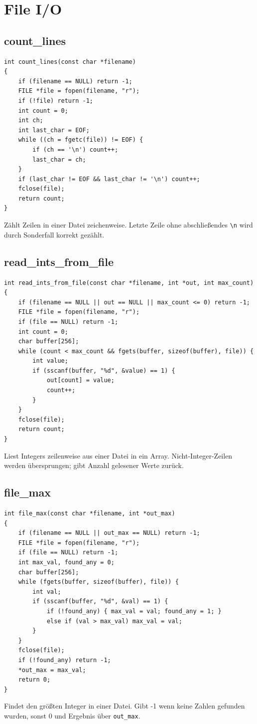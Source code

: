 \documentclass[10pt, a4paper]{article}
\begin{document}
\newpage
\section{File I/O}

\subsection{count\_lines}
\begin{lstlisting}
int count_lines(const char *filename)
{
    if (filename == NULL) return -1;
    FILE *file = fopen(filename, "r");
    if (!file) return -1;
    int count = 0;
    int ch;
    int last_char = EOF;
    while ((ch = fgetc(file)) != EOF) {
        if (ch == '\n') count++;
        last_char = ch;
    }
    if (last_char != EOF && last_char != '\n') count++;
    fclose(file);
    return count;
}
\end{lstlisting}
Z\"ahlt Zeilen in einer Datei zeichenweise. Letzte Zeile ohne abschlie\ss endes \texttt{\textbackslash n} wird durch Sonderfall korrekt gez\"ahlt.

\subsection{read\_ints\_from\_file}
\begin{lstlisting}
int read_ints_from_file(const char *filename, int *out, int max_count)
{
    if (filename == NULL || out == NULL || max_count <= 0) return -1;
    FILE *file = fopen(filename, "r");
    if (file == NULL) return -1;
    int count = 0;
    char buffer[256];
    while (count < max_count && fgets(buffer, sizeof(buffer), file)) {
        int value;
        if (sscanf(buffer, "%d", &value) == 1) {
            out[count] = value;
            count++;
        }
    }
    fclose(file);
    return count;
}
\end{lstlisting}
Liest Integers zeilenweise aus einer Datei in ein Array. Nicht-Integer-Zeilen werden \"ubersprungen; gibt Anzahl gelesener Werte zur\"uck.

\subsection{file\_max}
\begin{lstlisting}
int file_max(const char *filename, int *out_max)
{
    if (filename == NULL || out_max == NULL) return -1;
    FILE *file = fopen(filename, "r");
    if (file == NULL) return -1;
    int max_val, found_any = 0;
    char buffer[256];
    while (fgets(buffer, sizeof(buffer), file)) {
        int val;
        if (sscanf(buffer, "%d", &val) == 1) {
            if (!found_any) { max_val = val; found_any = 1; }
            else if (val > max_val) max_val = val;
        }
    }
    fclose(file);
    if (!found_any) return -1;
    *out_max = max_val;
    return 0;
}
\end{lstlisting}
Findet den gr\"o\ss ten Integer in einer Datei. Gibt -1 wenn keine Zahlen gefunden wurden, sonst 0 und Ergebnis \"uber \texttt{out\_max}.
\end{document}
